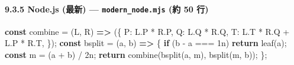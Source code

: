 \documentclass[
]{ltjsarticle}
\newenvironment{Shaded}{}{}
\newcommand{\AttributeTok}[1]{\textcolor[rgb]{0.49,0.56,0.16}{#1}}
\newcommand{\ControlFlowTok}[1]{\textcolor[rgb]{0.00,0.44,0.13}{\textbf{#1}}}
\newcommand{\DataTypeTok}[1]{\textcolor[rgb]{0.56,0.13,0.00}{#1}}
\newcommand{\DecValTok}[1]{\textcolor[rgb]{0.25,0.63,0.44}{#1}}
\newcommand{\FunctionTok}[1]{\textcolor[rgb]{0.02,0.16,0.49}{#1}}
\newcommand{\KeywordTok}[1]{\textcolor[rgb]{0.00,0.44,0.13}{\textbf{#1}}}
\newcommand{\NormalTok}[1]{#1}
\newcommand{\OperatorTok}[1]{\textcolor[rgb]{0.40,0.40,0.40}{#1}}
\begin{document}
\paragraph{\texorpdfstring{9.3.5 Node.js (最新) ---
\texttt{modern\_node.mjs} (約 50
行)}{9.3.5 Node.js (最新) --- modern\_node.mjs (約 50 行)}}\label{node.js-ux6700ux65b0-modern_node.mjs-ux7d04-50-ux884c}

\begin{Shaded}
\begin{Highlighting}[]
\KeywordTok{const}\NormalTok{ combine }\OperatorTok{=}\NormalTok{ (L}\OperatorTok{,}\NormalTok{ R) }\KeywordTok{=\textgreater{}}\NormalTok{ (\{}
    \DataTypeTok{P}\OperatorTok{:}\NormalTok{ L}\OperatorTok{.}\AttributeTok{P} \OperatorTok{*}\NormalTok{ R}\OperatorTok{.}\AttributeTok{P}\OperatorTok{,}
    \DataTypeTok{Q}\OperatorTok{:}\NormalTok{ L}\OperatorTok{.}\AttributeTok{Q} \OperatorTok{*}\NormalTok{ R}\OperatorTok{.}\AttributeTok{Q}\OperatorTok{,}
    \DataTypeTok{T}\OperatorTok{:}\NormalTok{ L}\OperatorTok{.}\AttributeTok{T} \OperatorTok{*}\NormalTok{ R}\OperatorTok{.}\AttributeTok{Q} \OperatorTok{+}\NormalTok{ L}\OperatorTok{.}\AttributeTok{P} \OperatorTok{*}\NormalTok{ R}\OperatorTok{.}\AttributeTok{T}\OperatorTok{,}
\NormalTok{\})}\OperatorTok{;}
\KeywordTok{const}\NormalTok{ bsplit }\OperatorTok{=}\NormalTok{ (a}\OperatorTok{,}\NormalTok{ b) }\KeywordTok{=\textgreater{}}\NormalTok{ \{}
    \ControlFlowTok{if}\NormalTok{ (b }\OperatorTok{{-}}\NormalTok{ a }\OperatorTok{===} \DecValTok{1}\NormalTok{n) }\ControlFlowTok{return} \FunctionTok{leaf}\NormalTok{(a)}\OperatorTok{;}
    \KeywordTok{const}\NormalTok{ m }\OperatorTok{=}\NormalTok{ (a }\OperatorTok{+}\NormalTok{ b) }\OperatorTok{/} \DecValTok{2}\NormalTok{n}\OperatorTok{;}
    \ControlFlowTok{return} \FunctionTok{combine}\NormalTok{(}\FunctionTok{bsplit}\NormalTok{(a}\OperatorTok{,}\NormalTok{ m)}\OperatorTok{,} \FunctionTok{bsplit}\NormalTok{(m}\OperatorTok{,}\NormalTok{ b))}\OperatorTok{;}
\NormalTok{\}}\OperatorTok{;}
\end{Highlighting}
\end{Shaded}
\end{document}

